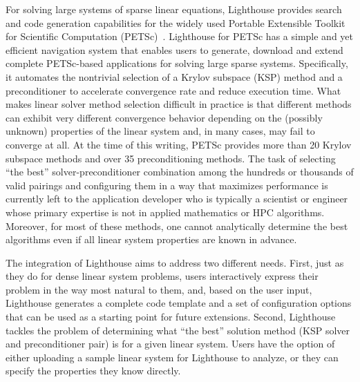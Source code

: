 \documentclass{sig-alternate}
\begin{document}
For solving large systems of sparse linear equations, Lighthouse provides search and code generation capabilities for the widely used
Portable Extensible Toolkit for Scientific Computation (PETSc)~\cite{petsc:Online}. 
Lighthouse for PETSc has a simple and yet efficient navigation system that enables users to generate, download
and extend complete PETSc-based applications for solving large sparse systems. 
Specifically, it automates the nontrivial selection of a Krylov subspace (KSP) method and a preconditioner to accelerate
convergence rate and reduce execution time. What makes linear solver method selection difficult in practice is that 
different methods can exhibit very different convergence behavior depending on the (possibly unknown) properties of the linear system
and, in many cases, may fail to converge at all. At the time of this writing, PETSc provides more than 20 Krylov subspace methods and over 
35 preconditioning methods. The task of selecting ``the best'' solver-preconditioner combination among the hundreds or thousands of valid pairings
and configuring them in a way that maximizes performance is currently left to the application developer who is typically 
a scientist or engineer whose primary expertise is not in applied mathematics or HPC algorithms. Moreover, for most of these methods, 
one cannot analytically determine the best algorithms even if all linear system properties are known in advance.

The integration of Lighthouse aims to address two different needs. First, just as they do for dense linear system problems, users interactively
express their problem in the way most natural to them, and, based on the user input, Lighthouse generates a complete code template
and a set of configuration options that can be used as a starting point for future extensions. Second, Lighthouse tackles the problem
of determining what ``the best'' solution method (KSP solver and preconditioner pair) is for a given linear system. Users have the option
of either uploading a sample linear system for Lighthouse to analyze, or they can specify the properties they know directly.
\end{document}
